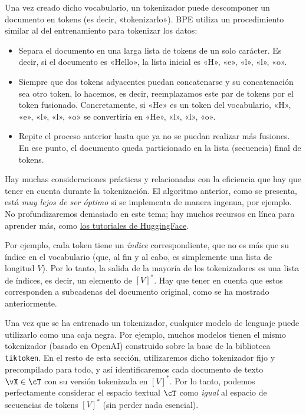 \documentclass[../../book-main_es.tex]{subfiles}
\begin{document}
Una vez creado dicho vocabulario, un tokenizador puede descomponer un
documento en tokens (es decir, «tokenizarlo»). BPE utiliza un procedimiento similar
al del entrenamiento para tokenizar los datos:
\begin{itemize}
\item Separa el documento en una larga lista de tokens de un solo carácter.
    Es decir, si el documento es «Hello», la lista inicial
    es «H», «e», «l», «l», «o».
\item Siempre que dos tokens adyacentes puedan concatenarse y su
    concatenación sea otro token, lo hacemos, es decir, reemplazamos este
    par de tokens por el token fusionado. Concretamente, si «He» es un token
    del vocabulario, «H», «e», «l», «l», «o» se convertiría en «He», «l», «l», «o».
\item Repite el proceso anterior hasta que ya no se puedan realizar más fusiones. En
    ese punto, el documento queda particionado en la lista
    (secuencia) final de tokens.
\end{itemize}

Hay muchas consideraciones prácticas y relacionadas con la eficiencia que hay que
tener en cuenta durante la tokenización. El algoritmo anterior, como se presenta,
está \textit{muy lejos de ser óptimo} si se implementa de manera ingenua, por
ejemplo. No profundizaremos demasiado en este tema; hay muchos
recursos en línea para aprender más, como
\href{https://huggingface.co/learn/nlp-course/en/chapter6/5}{los tutoriales de HuggingFace}.

Por ejemplo, cada token tiene un \textit{índice} correspondiente, que no es
más que su índice en el vocabulario (que, al fin y al cabo, es simplemente una lista de
longitud \(V\)). Por lo tanto, la salida de la mayoría de los tokenizadores es una lista de
índices, es decir, un elemento de \([V]^{*}\). Hay que tener en cuenta que estos
corresponden a subcadenas del documento original, como se ha mostrado anteriormente.

Una vez que se ha entrenado un tokenizador, cualquier
modelo de lenguaje puede utilizarlo como una caja negra. Por ejemplo, muchos modelos tienen el mismo
tokenizador (basado en OpenAI) construido sobre la base de la biblioteca \texttt{tiktoken}. En
el resto de esta sección, utilizaremos dicho tokenizador fijo y precompilado
para todo, y así identificaremos cada documento de texto \(\vX
\in \cT\) con su versión tokenizada en \([V]^{*}\). Por lo tanto,
podemos perfectamente considerar el espacio textual \(\cT\) como \textit{igual} al
espacio de secuencias de tokens \([V]^{*}\) (sin perder nada esencial).
\end{document}
